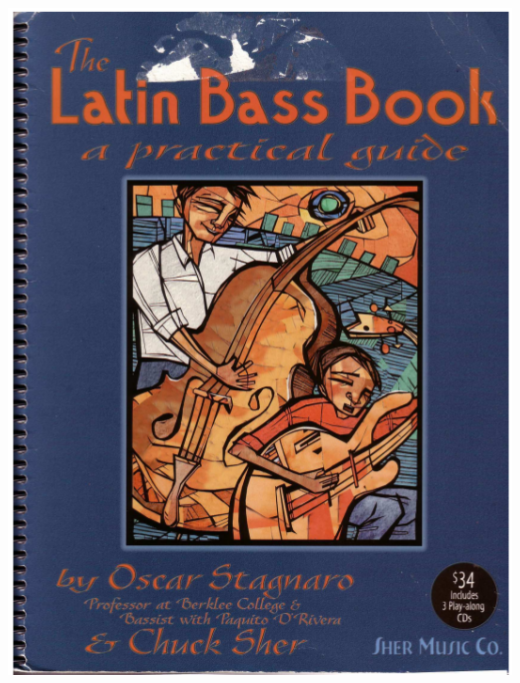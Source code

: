 \documentclass[a4paper]{book}
\begin{document}
\begin{center}
\includegraphics[width=14.178cm,height=18.755cm]{lebluessupportsmethodes-img173.png}
\end{center}
\end{document}
